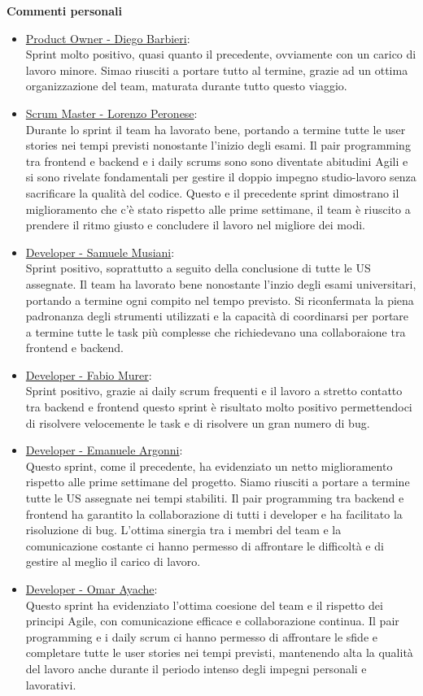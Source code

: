 \documentclass{article}
\begin{document}
\textbf{Commenti personali}
\begin{itemize}
    \item \underline{Product Owner - Diego Barbieri}: \\
    Sprint molto positivo, quasi quanto il precedente, ovviamente con un carico di lavoro minore. Simao riusciti a portare tutto al termine, 
    grazie ad un ottima organizzazione del team, maturata durante tutto questo viaggio.
    \item \underline{Scrum Master - Lorenzo Peronese}: \\
    Durante lo sprint il team ha lavorato bene, portando a termine tutte le user stories nei tempi previsti nonostante l'inizio degli esami. 
    Il pair programming tra frontend e backend e i daily scrums sono sono diventate abitudini Agili e si sono rivelate fondamentali per gestire 
    il doppio impegno studio-lavoro senza sacrificare la qualità del codice. Questo e il precedente sprint dimostrano il miglioramento 
    che c'è stato rispetto alle prime settimane, il team è riuscito a prendere il ritmo giusto e concludere il lavoro nel migliore dei modi.
    \item \underline{Developer - Samuele Musiani}: \\
    Sprint positivo, soprattutto a seguito della conclusione di tutte le US assegnate. Il team ha lavorato bene nonostante l'inzio degli esami universitari,
    portando a termine ogni compito nel tempo previsto. Si riconfermata la piena padronanza degli strumenti utilizzati e la capacità di coordinarsi per portare a termine
    tutte le task più complesse che richiedevano una collaboraione tra frontend e backend.
    \item \underline{Developer - Fabio Murer}: \\
    Sprint positivo, grazie ai daily scrum frequenti e il lavoro a stretto contatto tra backend e frontend questo sprint 
è risultato molto positivo permettendoci di risolvere velocemente le task e di risolvere un gran numero di bug.
    \item \underline{Developer - Emanuele Argonni}: \\
    Questo sprint, come il precedente, ha evidenziato un netto miglioramento rispetto alle prime settimane del progetto. Siamo riusciti a portare a termine tutte le US
    assegnate nei tempi stabiliti. Il pair programming tra backend e frontend ha garantito la collaborazione di tutti i developer e ha facilitato la risoluzione di bug.
    L'ottima sinergia tra i membri del team e la comunicazione costante ci hanno permesso di affrontare le difficoltà e di gestire al meglio il carico di lavoro.
    \item \underline{Developer - Omar Ayache}:\\
    Questo sprint ha evidenziato l’ottima coesione del team e il rispetto dei principi Agile, con comunicazione efficace e collaborazione continua. Il pair programming e 
    i daily scrum ci hanno permesso di affrontare le sfide e completare tutte le user stories nei tempi previsti, mantenendo alta la qualità del lavoro anche durante 
    il periodo intenso degli impegni personali e lavorativi.
\end{itemize} 
\end{document}

